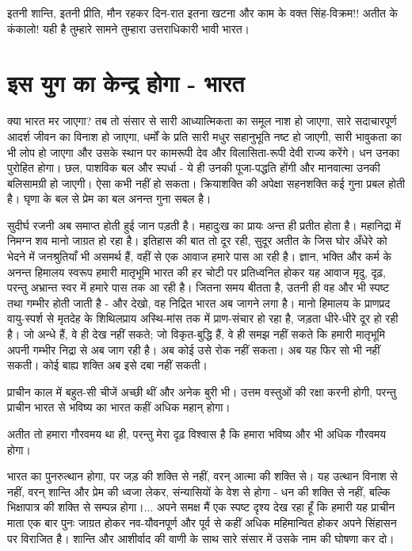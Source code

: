 इतनी शान्ति, इतनी प्रीति, मौन रहकर दिन-रात इतना खटना और काम के वक्त सिंह-विक्रम!! अतीत के कंकालो! यही है तुम्हारे सामने तुम्हारा उत्तराधिकारी भावी भारत।


\section*{इस युग का केन्द्र होगा - भारत}


क्या भारत मर जाएगा? तब तो संसार से सारी आध्यात्मिकता का समूल नाश हो जाएगा, सारे सदाचारपूर्ण आदर्श जीवन का विनाश हो जाएगा, धर्मों के प्रति सारी मधुर सहानुभूति नष्ट हो जाएगी, सारी भावुकता का भी लोप हो जाएगा और उसके स्थान पर कामरूपी देव और विलासिता-रूपी देवी राज्य करेंगे। धन उनका पुरोहित होगा। छल, पाशविक बल और स्पर्धा - ये ही उनकी पूजा-पद्धति होंगी और मानवात्मा उनकी बलिसामग्री हो जाएगी। ऐसा कभी नहीं हो सकता। क्रियाशक्ति की अपेक्षा सहनशक्ति कई गुना प्रबल होती है। घृणा के बल से प्रेम का बल अनन्त गुना सबल है। 

सुदीर्घ रजनी अब समाप्त होती हुई जान पड़ती है। महादुःख का प्रायः अन्त ही प्रतीत होता है। महानिद्रा में निमग्न शव मानो जाग्रत हो रहा है। इतिहास की बात तो दूर रही, सुदूर अतीत के जिस घोर अँधेरे को भेदने में जनश्रुतियाँ भी असमर्थ हैं, वहीं से एक आवाज हमारे पास आ रही है। ज्ञान, भक्ति और कर्म के अनन्त हिमालय स्वरूप हमारी मातृभूमि भारत की हर चोटी पर प्रतिध्वनित होकर यह आवाज मृदु, दृढ़, परन्तु अभ्रान्त स्वर में हमारे पास तक आ रही है। जितना समय बीतता है, उतनी ही वह और भी स्पष्ट तथा गम्भीर होती जाती है - और देखो, वह निद्रित भारत अब जागने लगा है। मानो हिमालय के प्राणप्रद वायु-स्पर्श से मृतदेह के शिथिलप्राय अस्थि-मांस तक में प्राण-संचार हो रहा है, जड़ता धीरे-धीरे दूर हो रही है। जो अन्धे हैं, वे ही देख नहीं सकते; जो विकृत-बुद्धि हैं, वे ही समझ नहीं सकते कि हमारी मातृभूमि अपनी गम्भीर निद्रा से अब जाग रही है। अब कोई उसे रोक नहीं सकता। अब यह फिर सो भी नहीं सकती। कोई बाह्य शक्ति अब इसे दबा नहीं सकती। 

प्राचीन काल में बहुत-सी चीजें अच्छी थीं और अनेक बुरी भी। उत्तम वस्तुओं की रक्षा करनी होगी, परन्तु प्राचीन भारत से भविष्य का भारत कहीं अधिक महान् होगा। 

अतीत तो हमारा गौरवमय था ही, परन्तु मेरा दृढ़ विश्वास है कि हमारा भविष्य और भी अधिक गौरवमय होगा। 

भारत का पुनरुत्थान होगा, पर जड़ की शक्ति से नहीं, वरन् आत्मा की शक्ति से। यह उत्थान विनाश से नहीं, वरन् शान्ति और प्रेम की ध्वजा लेकर, संन्यासियों के वेश से होगा - धन की शक्ति से नहीं, बल्कि भिक्षापात्र की शक्ति से सम्पन्न होगा।... अपने समक्ष मैं एक स्पष्ट दृश्य देख रहा हूँ कि हमारी यह प्राचीन माता एक बार पुनः जाग्रत होकर नव-यौवनपूर्ण और पूर्व से कहीं अधिक महिमान्वित होकर अपने सिंहासन पर विराजित है। शान्ति और आशीर्वाद की वाणी के साथ सारे संसार में उसके नाम की घोषणा कर दो। 

